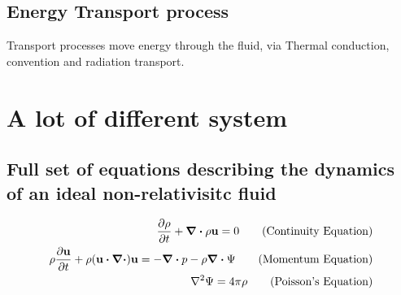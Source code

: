 \documentclass[12pt,a4paper]{article}
\begin{document}
    \subsection{Energy Transport process}
        Transport processes move energy through the fluid, via
        Thermal conduction, convention and radiation transport.
\section{A lot of different system}
    \subsection{Full set of equations describing the dynamics of an ideal non-relativisitc fluid}
        \begin{align*}
            \pdv{\rho}{t} + \div{\rho \vb{u}} = 0 \tag{Continuity Equation}\\
            \rho \pdv{\vb{u}}{t}+\rho (\vb{u}\dotproduct \div)\vb{u}=-\div{p}-\rho\div{\Psi}\tag{Momentum Equation}\\
            \laplacian{\Psi} = 4\pi\rho \tag{Poisson's Equation}\\
        \end{align*}
        \begin{equation}
            \tag{Energy Equation}
        \end{equation}
        \begin{equation}
            \tag{Definition fo Total energy}
        \end{equation}
        \begin{equation}
            \tag{EoS of total energy}
        \end{equation}
        \begin{equation}
            \tag{Internal Energy}
        \end{equation}
\end{document}
